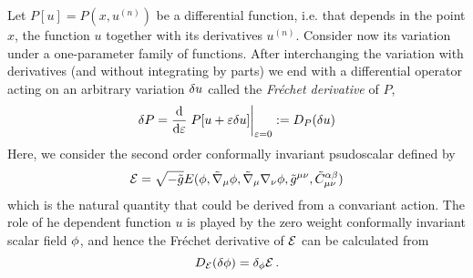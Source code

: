 Let $P[u]=P\left(x,u^{(n)}\right)$ be a differential function, i.e. that depends in the point $x$, the function $u$ together with its derivatives $u^{(n)}$. Consider now its variation under a one-parameter family of functions. After interchanging the variation with derivatives (and without integrating by parts) we end with a differential operator acting on an arbitrary variation $\delta u$ called the \textit{Fréchet derivative} of $P$,
\begin{equation}
  \d P=\dv{\varepsilon}\eval{P[u+\varepsilon\d u]}_{\varepsilon=0}:=D_P(\d u)
\end{equation}
Here, we consider the second order conformally invariant psudoscalar defined by
\begin{equation}\label{E-frechet}
  \mathcal{E}=\sqrt{-\tilde{g}}E(\phi,\tilde{\nabla}_\mu\phi ,\tilde{\nabla}_\mu\nabla_\nu \phi ,\tilde{g}^{\mu\nu },\tilde{C}_{\mu\nu }^{\alpha\beta })
\end{equation}
which is the natural quantity that could be derived from a convariant action. The role of he dependent function $u$ is played by the zero weight conformally invariant scalar field $\phi$,  and hence the Fréchet derivative of $\mathcal{E}$ can be calculated from
\begin{equation}
  D_{\mathcal{E}}(\delta\phi )=\delta_\phi\mathcal{E}\, .
\end{equation}

